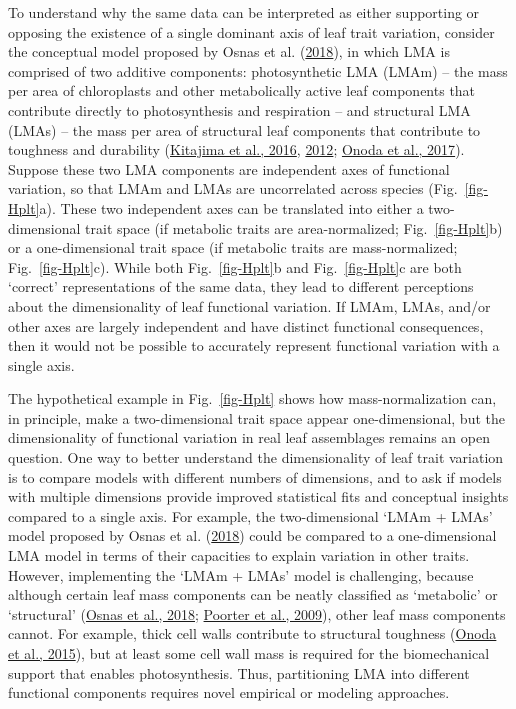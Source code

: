 \documentclass[
  12pt,
  a4paper,
,tablecaptionabove
]{scrartcl}
\begin{document}
To understand why the same data can be interpreted as either supporting
or opposing the existence of a single dominant axis of leaf trait
variation, consider the conceptual model proposed by Osnas et al.
(\protect\hyperlink{ref-Osnas2018}{2018}), in which LMA is comprised of
two additive components: photosynthetic LMA (LMAm) -- the mass per area
of chloroplasts and other metabolically active leaf components that
contribute directly to photosynthesis and respiration -- and structural
LMA (LMAs) -- the mass per area of structural leaf components that
contribute to toughness and durability
(\protect\hyperlink{ref-Kitajima2016}{Kitajima et al., 2016},
\protect\hyperlink{ref-Kitajima2012}{2012};
\protect\hyperlink{ref-Onoda2017}{Onoda et al., 2017}). Suppose these
two LMA components are independent axes of functional variation, so that
LMAm and LMAs are uncorrelated across species (Fig.~\ref{fig-Hplt}a).
These two independent axes can be translated into either a
two-dimensional trait space (if metabolic traits are area-normalized;
Fig.~\ref{fig-Hplt}b) or a one-dimensional trait space (if metabolic
traits are mass-normalized; Fig.~\ref{fig-Hplt}c). While both
Fig.~\ref{fig-Hplt}b and Fig.~\ref{fig-Hplt}c are both `correct'
representations of the same data, they lead to different perceptions
about the dimensionality of leaf functional variation. If LMAm, LMAs,
and/or other axes are largely independent and have distinct functional
consequences, then it would not be possible to accurately represent
functional variation with a single axis.

The hypothetical example in Fig.~\ref{fig-Hplt} shows how
mass-normalization can, in principle, make a two-dimensional trait space
appear one-dimensional, but the dimensionality of functional variation
in real leaf assemblages remains an open question. One way to better
understand the dimensionality of leaf trait variation is to compare
models with different numbers of dimensions, and to ask if models with
multiple dimensions provide improved statistical fits and conceptual
insights compared to a single axis. For example, the two-dimensional
`LMAm + LMAs' model proposed by Osnas et al.
(\protect\hyperlink{ref-Osnas2018}{2018}) could be compared to a
one-dimensional LMA model in terms of their capacities to explain
variation in other traits. However, implementing the `LMAm + LMAs' model
is challenging, because although certain leaf mass components can be
neatly classified as `metabolic' or `structural'
(\protect\hyperlink{ref-Osnas2018}{Osnas et al., 2018};
\protect\hyperlink{ref-Poorter2009}{Poorter et al., 2009}), other leaf
mass components cannot. For example, thick cell walls contribute to
structural toughness (\protect\hyperlink{ref-Onoda2015}{Onoda et al.,
2015}), but at least some cell wall mass is required for the
biomechanical support that enables photosynthesis. Thus, partitioning
LMA into different functional components requires novel empirical or
modeling approaches.
\end{document}
